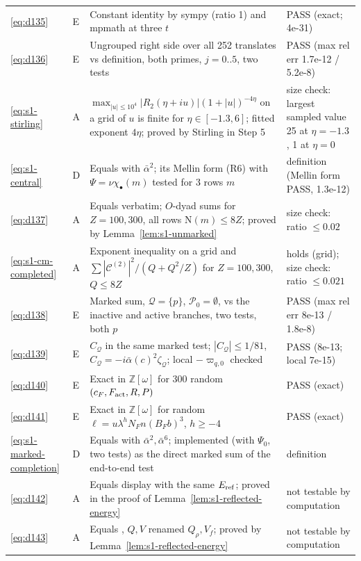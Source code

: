 \documentclass[11pt]{article}
\numberwithin{equation}{section}
\newcommand{\N}{\mathrm N}
\begin{document}
\begin{longtable}{@{}>{\raggedright\arraybackslash}p{1.2cm}>{\centering\arraybackslash}p{0.7cm}>{\raggedright\arraybackslash}p{9.05cm}>{\raggedright\arraybackslash}p{4.3cm}@{}}
\eqref{eq:d135} & E & Constant identity by sympy (ratio 1) and mpmath at three $t$ & PASS (exact; 4e-31)\\
\eqref{eq:d136} & E & Ungrouped right side over all 252 translates vs definition, both primes, $j=0..5$, two tests & PASS (max rel err 1.7e-12 / 5.2e-8)\\
\eqref{eq:s1-stirling} & A & $\max_{|u|\le10^4}|R_2(\eta+iu)|(1+|u|)^{-4\eta}$ on a grid of $u$ is finite for $\eta\in[-1.3,6]$; fitted exponent $4\eta$; proved by Stirling in Step 5 & size check: largest sampled value 25 at $\eta=-1.3$, 1 at $\eta=0$\\
\eqref{eq:s1-central} & D & Equals \cite[eq.~(5.30)]{OAI78} with $\bar\alpha^2$; its Mellin form (R6) with $\Psi=\nu\chi_\bullet(m)$ tested for 3 rows $m$ & definition (Mellin form PASS, 1.3e-12)\\
\eqref{eq:d137} & A & Equals \cite[eq.~(5.36)]{OAI78} verbatim; $O$-dyad sums for $Z=100,300$, all rows $\N(m)\le8Z$; proved by Lemma~\ref{lem:s1-unmarked} & size check: ratio $\le0.02$\\
\eqref{eq:s1-cm-completed} & A & Exponent inequality on a grid and $\sum|\mathcal C^{(2)}|^2/(Q+Q^2/Z)$ for $Z=100,300$, $Q\le8Z$ & holds (grid); size check: ratio $\le0.021$\\
\eqref{eq:d138} & E & Marked sum, $\mathcal Q=\{p\}$, $\mathcal P_0=\emptyset$, vs the inactive and active branches, two tests, both $p$ & PASS (max rel err 8e-13 / 1.8e-8)\\
\eqref{eq:d139} & E & $C_{\mathcal Q}$ in the same marked test; $|C_{\mathcal Q}|\le1/81$, $C_{\mathcal Q}=-i\bar\alpha(c)^2\zeta_{\mathcal Q}$; local $-\varpi_{q,0}$ checked & PASS (8e-13; local 7e-15)\\
\eqref{eq:d140} & E & Exact in $\mathbb Z[\omega]$ for 300 random $(c_F,F_{\rm act},R,P)$ & PASS (exact)\\
\eqref{eq:d141} & E & Exact in $\mathbb Z[\omega]$ for random $\ell=u\lambda^{h}N_Fn(B_Fb)^3$, $h\ge-4$ & PASS (exact)\\
\eqref{eq:s1-marked-completion} & D & Equals \cite[eq.~(14.2)]{OAI78} with $\bar\alpha^2,\bar\alpha^6$; implemented (with $\Psi_0$, two tests) as the direct marked sum of the end-to-end test & definition\\
\eqref{eq:d142} & A & Equals \cite[Lemma~14.3]{OAI78} display with the same $E_{\rm ref}$; proved in the proof of Lemma~\ref{lem:s1-reflected-energy} & not testable by computation\\
\eqref{eq:d143} & A & Equals \cite[eq.~(14.18)]{OAI78}, $Q,V$ renamed $Q_\rho,V_f$; proved by Lemma~\ref{lem:s1-reflected-energy} & not testable by computation\\

\end{longtable}
\end{document}
